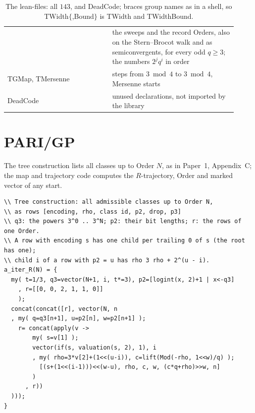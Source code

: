 \documentclass[11pt,a4paper,titlepage]{article}
\newcommand{\lean}[1]{\textsf{#1}}
\begin{document}
\begin{table}[p]
\begin{tabular}{@{}>{\raggedright\arraybackslash}p{0.42\linewidth}>{\raggedright\arraybackslash}p{0.5\linewidth}@{}}
  & the sweeps and the record Orders, also on the Stern--Brocot walk and as semiconvergents, for every odd $q \ge 3$; the numbers $2^j q^i$ in order \\
\lean{TGMap}, \lean{TMersenne}
  & steps from $3 \bmod 4$ to $3 \bmod 4$, Mersenne starts \\
\lean{DeadCode}
  & unused declarations, not imported by the library \\
\bottomrule
\end{tabular}
\caption{The lean-files: all $143$, and \lean{DeadCode}; braces group names as in a shell, so \lean{TWidth$\{$,Bound$\}$} is \lean{TWidth} and \lean{TWidthBound}.}
\label{tab:lean}
\end{table}

\section{PARI/GP}
\label{app:pari}

The tree construction lists all classes up to Order $N$, as in
Paper~1, Appendix~C; the map and trajectory code computes the $R$-trajectory,
Order and marked vector of any start.

\begin{lstlisting}[basicstyle=\ttfamily\scriptsize, breaklines=true]
\\ Tree construction: all admissible classes up to Order N,
\\ as rows [encoding, rho, class id, p2, drop, p3]
\\ q3: the powers 3^0 .. 3^N; p2: their bit lengths; r: the rows of one Order.
\\ A row with encoding s has one child per trailing 0 of s (the root has one);
\\ child i of a row with p2 = u has rho 3 rho + 2^(u - i).
a_iter_R(N) = {
  my( t=1/3, q3=vector(N+1, i, t*=3), p2=[logint(x, 2)+1 | x<-q3]
    , r=[[0, 0, 2, 1, 1, 0]]
    );
  concat(concat([r], vector(N, n
  , my( q=q3[n+1], u=p2[n], w=p2[n+1] );
    r= concat(apply(v ->
        my( s=v[1] );
        vector(if(s, valuation(s, 2), 1), i
        , my( rho=3*v[2]+(1<<(u-i)), c=lift(Mod(-rho, 1<<w)/q) );
          [(s+(1<<(i-1)))<<(w-u), rho, c, w, (c*q+rho)>>w, n]
        )
      , r))
  )));
}
\end{lstlisting}
\end{document}
